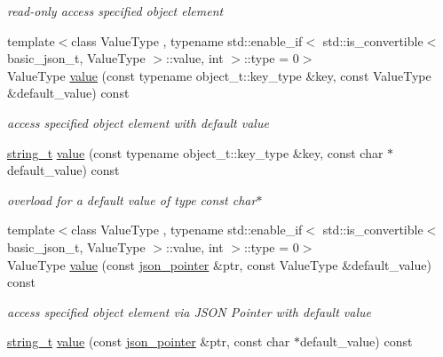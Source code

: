 \begin{DoxyCompactItemize}
\begin{DoxyCompactList}\small\item\em read-\/only access specified object element \end{DoxyCompactList}\item 
{\footnotesize template$<$class Value\+Type , typename std\+::enable\+\_\+if$<$ std\+::is\+\_\+convertible$<$ basic\+\_\+json\+\_\+t, Value\+Type $>$\+::value, int $>$\+::type  = 0$>$ }\\Value\+Type \hyperlink{classnlohmann_1_1basic__json_a404017aa52714a0a4bc79d5af7e4ad2b}{value} (const typename object\+\_\+t\+::key\+\_\+type \&key, const Value\+Type \&default\+\_\+value) const 
\begin{DoxyCompactList}\small\item\em access specified object element with default value \end{DoxyCompactList}\item 
\hyperlink{classnlohmann_1_1basic__json_a61f8566a1a85a424c7266fb531dca005}{string\+\_\+t} \hyperlink{classnlohmann_1_1basic__json_a1ad55f9d26934e05add021b2513a9ac1}{value} (const typename object\+\_\+t\+::key\+\_\+type \&key, const char $\ast$default\+\_\+value) const 
\begin{DoxyCompactList}\small\item\em overload for a default value of type const char$\ast$ \end{DoxyCompactList}\item 
{\footnotesize template$<$class Value\+Type , typename std\+::enable\+\_\+if$<$ std\+::is\+\_\+convertible$<$ basic\+\_\+json\+\_\+t, Value\+Type $>$\+::value, int $>$\+::type  = 0$>$ }\\Value\+Type \hyperlink{classnlohmann_1_1basic__json_adeaf9df62baf48a057876ef558f5a1b5}{value} (const \hyperlink{classnlohmann_1_1basic__json_a6886a5001f5b449ad316101a311ce536}{json\+\_\+pointer} \&ptr, const Value\+Type \&default\+\_\+value) const 
\begin{DoxyCompactList}\small\item\em access specified object element via J\+S\+ON Pointer with default value \end{DoxyCompactList}\item 
\hyperlink{classnlohmann_1_1basic__json_a61f8566a1a85a424c7266fb531dca005}{string\+\_\+t} \hyperlink{classnlohmann_1_1basic__json_af6a68b55f28fcce225017920de1435db}{value} (const \hyperlink{classnlohmann_1_1basic__json_a6886a5001f5b449ad316101a311ce536}{json\+\_\+pointer} \&ptr, const char $\ast$default\+\_\+value) const 

\end{DoxyCompactItemize}
